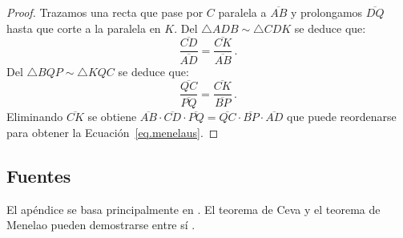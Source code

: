 \begin{proof}
Trazamos una recta que pase por $C$ paralela a $\overline{AB}$ y prolongamos $\overline{DQ}$ hasta que corte a la paralela en $K$. Del $\triangle ADB \sim \triangle CDK$ se deduce que:
\begin{equation*}
\displaystyle\frac{\overline{CD}}{\overline{AD}}=\displaystyle\frac{\overline{CK}}{\overline{AB}}\,.
\end{equation*}
Del $\triangle BQP\sim \triangle KQC$ se deduce que:
\begin{equation*}
\displaystyle\frac{\overline{QC}}{\overline{PQ}}=\displaystyle\frac{\overline{CK}}{\overline{BP}}\,.
\end{equation*}
Eliminando $\overline{CK}$ se obtiene
$\overline{AB}\cdot\overline{CD}\cdot\overline{PQ}=\overline{QC}\cdot\overline{BP}\cdot\overline{AD}$ que puede reordenarse para obtener la Ecuación~\ref{eq.menelaus}.
\end{proof}


\subsection*{Fuentes}

El apéndice se basa principalmente en \cite{gelfand}. El teorema de Ceva y el teorema de Menelao pueden demostrarse entre sí \cite{silvester}.
